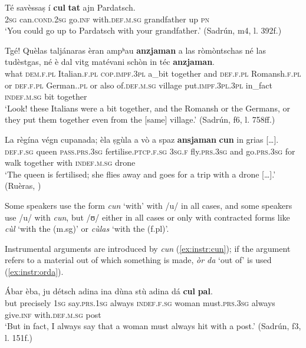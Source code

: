 \ea
\label{ex:comcun}
\gll Té savèssaṣ í \textbf{cul} \textbf{tat} ajn Pardatsch.  \\
 \textsc{2sg} can.\textsc{cond.2sg} go.\textsc{inf} with.\textsc{def.m.sg} grandfather up \textsc{pn}  \\
\glt `You could go up to Pardatsch with your grandfather.' (Sadrún, m4, l. 392f.)
\z

\ea
\label{ex:ansjaman}
\gll    Tgé! Quèlas taljánaras èran ampʰau \textbf{anzjaman} a las ròmòntschas né las tudèstgas, né è dal vitg matévani schòn in téc \textbf{anzjaman}.\\
what \textsc{dem.f.pl} Italian.\textsc{f.pl} \textsc{cop.impf.3pl} a\_bit together and \textsc{def\textbf{}.f.pl} Romansh.\textsc{f.pl} or  \textsc{def.f.pl} German.\textsc{.pl} or also of.\textsc{def.m.sg} village put.\textsc{impf.3pl.3pl} in\_fact \textsc{indef.m.sg} bit together\\
\glt `Look! these Italians were a bit together, and the Romansh or the Germans, or they put them together even from the [same] village.' (Sadrún, f6, l. 758ff.)
\z

\ea
\label{ex:ansjamancun}
\gll   La règína végn cupanada; èla ṣgùla a vò a spaz \textbf{ansjaman} \textbf{cun} in grias […]. \\
    \textsc{def.f.sg} queen \textsc{pass.prs.3sg} fertilise.\textsc{ptcp.f.sg} \textsc{3sg.f} fly.\textsc{prs.3sg} and go.\textsc{prs.3sg} for walk together with \textsc{indef.m.sg} drone \\
\glt `The queen is fertilised; she flies away and goes for a trip with a drone […].' (Ruèras, )
\z

Some speakers use the form \textit{cun} `with' with /u/ in all cases, and some speakers use /u/ with \textit{cun}, but /ʊ/ either in all cases or only with contracted forms like \textit{cùl} `with the (m.sg)' or \textit{cùlas} `with the (f.pl)'.

Instrumental arguments are introduced by \textit{cun} (\ref{ex:instr:cun}); if the argument refers to a material out of which something is made, \textit{òr da} `out of' is used (\ref{ex:instr:orda}).

\ea
\label{ex:instr:cun}
\gll Ábar èba, ju détsch adina ina dùna stù adina dá \textbf{cul} \textbf{pal}.\\
but precisely \textsc{1sg} say.\textsc{prs.1sg} always \textsc{indef.f.sg} woman must.\textsc{prs.3sg} always give.\textsc{inf} with.\textsc{def.m.sg} post\\
\glt `But in fact, I always say that a woman must always hit with a post.' (Sadrún, f3, l. 151f.)
\z


